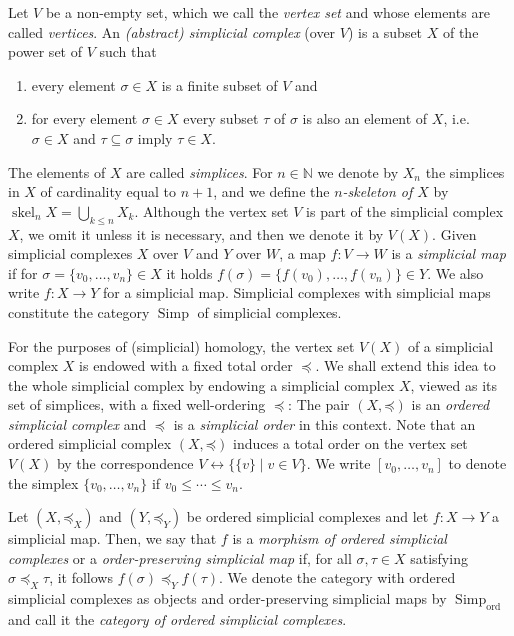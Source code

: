 \documentclass[oneside]{amsart}
\theoremstyle{definition}
\DeclareMathOperator\skel{skel}
\newcommand\ord{\mathrm{ord}}
\newcommand\Simp{\operatorname{Simp}}
\begin{document}
Let $V$ be a non-empty set, which we call the \emph{vertex set} and whose elements are called \emph{vertices}.
An \emph{(abstract) simplicial complex} (over $V$) is a subset $X$ of the power set of $V$ such that
\begin{enumerate}[label=(\roman*)]
    \item every element $\sigma \in X$ is a finite subset of $V$ and
    \item for every element $\sigma \in X$ every subset $\tau$ of $\sigma$ is also an element of $X$, i.e.\ $\sigma \in X$ and $\tau \subseteq \sigma$ imply $\tau \in X$.
\end{enumerate}
The elements of $X$ are called \emph{simplices}.
For $n \in \mathbb N$ we denote by $X_n$ the simplices in $X$ of cardinality equal to $n + 1$, and we define the \emph{$n$-skeleton of $X$} by $\skel_n X = \bigcup_{k \leq n} X_k$.
Although the vertex set $V$ is part of the simplicial complex $X$, we omit it unless it is necessary, and then we denote it by $V(X)$.
Given simplicial complexes $X$ over $V$ and $Y$ over $W$, a map $f\colon V \to W$ is a \emph{simplicial map} if for $\sigma = \{ v_0, \dotsc, v_n \} \in X$ it holds $f(\sigma) = \{ f(v_0), \dotsc, f(v_n) \} \in Y$.
We also write $f \colon X \to Y$ for a simplicial map.
Simplicial complexes with simplicial maps constitute the category $\Simp$ of simplicial complexes.

For the purposes of (simplicial) homology, the vertex set $V(X)$ of a simplicial complex $X$ is endowed with a fixed total order $\preceq$.
We shall extend this idea to the whole simplicial complex by endowing a simplicial complex $X$, viewed as its set of simplices, with a fixed well-ordering $\preceq$:
The pair $(X, \mathord\preceq)$ is an \emph{ordered simplicial complex} and $\preceq$ is a \emph{simplicial order} in this context.
Note that an ordered simplicial complex $(X, \mathord\preceq)$ induces a total order on the vertex set $V(X)$ by the correspondence $V \leftrightarrow \{ \{ v \} \mid v \in V \}$.
We write $[v_0, \dotsc, v_n]$ to denote the simplex $\{ v_0, \dotsc, v_n\}$ if $v_0 \leq \dotsb \leq v_n$.

Let $(X, \mathord\preceq_X)$ and $(Y, \mathord\preceq_Y)$ be ordered simplicial complexes and let $f\colon X \to Y$ a simplicial map.
Then, we say that $f$ is a \emph{morphism of ordered simplicial complexes} or a \emph{order-preserving simplicial map} if, for all $\sigma, \tau \in X$ satisfying $\sigma \preceq_X \tau$, it follows $f(\sigma) \preceq_Y f(\tau)$.
We denote the category with ordered simplicial complexes as objects and order-preserving simplicial maps by $\Simp_\ord$ and call it the \emph{category of ordered simplicial complexes}.
\end{document}
